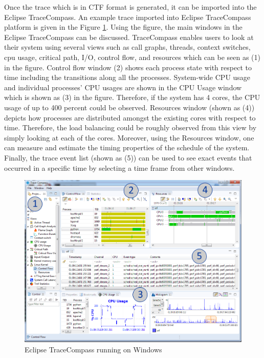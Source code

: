 \begin{itemize}
	Once the trace which is in CTF format is generated, it can be imported into the Eclipse TraceCompass. An example trace imported into Eclipse TraceCompass platform is given in the Figure \ref{fig:tracecompass}. Using the figure, the main windows in the Eclipse TraceCompass can be discussed. TraceCompass enables users to look at their system using several views such as call graphs, threads, context switches, cpu usage, critical path, I/O, control flow, and resources which can be seen as (1) in the figure. Control flow window (2) shows each process state with respect to time including the transitions along all the processes. System-wide CPU usage and individual processes' CPU usages are shown in the CPU Usage window which is shown as (3) in the figure. Therefore, if the system has 4 cores, the CPU usage of up to 400 percent could be observed. Resources window (shown as (4)) depicts how processes are distributed amongst the existing cores with respect to time. Therefore, the load balancing could be roughly observed from this view by simply looking at each of the cores. Moreover, using the Resources window, one can measure and estimate the timing properties of the schedule of the system. Finally, the trace event list (shown as (5)) can be used to see exact events that occurred in a specific time by selecting a time frame from other windows.
	\begin{figure}[!ht]
		\centering
		\includegraphics[scale=0.4]{content/images/tracecompass.png}
		\caption{Eclipse TraceCompass running on Windows}
		\label{fig:tracecompass}
	\end{figure}
	

\end{itemize}
